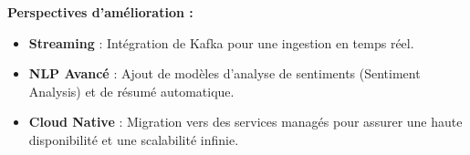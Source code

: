 \documentclass[12pt,a4paper]{article}
\begin{document}
\textbf{Perspectives d'amélioration :}
\begin{itemize}
    \item \textbf{Streaming} : Intégration de Kafka pour une ingestion en temps réel.
    \item \textbf{NLP Avancé} : Ajout de modèles d'analyse de sentiments (Sentiment Analysis) et de résumé automatique.
    \item \textbf{Cloud Native} : Migration vers des services managés pour assurer une haute disponibilité et une scalabilité infinie.
\end{itemize}
\end{document}

